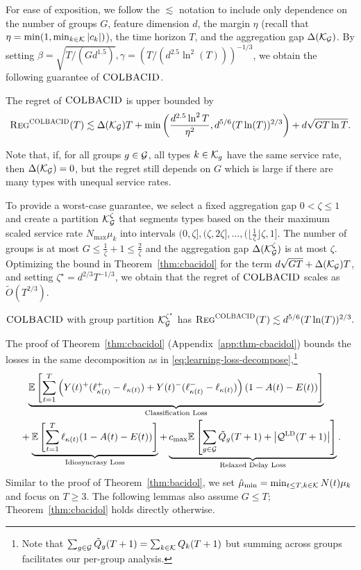 

For ease of exposition, we follow the $\lesssim$ notation to include only dependence on the number of groups $G$, feature dimension $d$, the margin $\eta$ (recall that $\eta = \min(1,\min_{k \in \mathcal{K}} |c_k|)$), the time horizon $T$, and the aggregation gap $\Delta(\mathcal{K}_{\mathcal{G}})$. By setting $\beta = \sqrt{T / (Gd^{1.5})}, \gamma = (T / (d^{2.5}\ln^{2}(T)))^{-1/3}$, we obtain the following guarantee of $\textsc{COLBACID}$. 
\begin{theorem}\label{thm:cbacidol}
The regret of $\textsc{COLBACID}$ is upper bounded by
\[
\textsc{Reg}^{\textsc{COLBACID}}(T) \lesssim \Delta(\mathcal{K}_{\mathcal{G}})T+\min\left(\frac{d^{2.5}\ln^{2} T}{\eta^2}, d^{5/6}(T\ln(T))^{2/3}\right)+ d\sqrt{GT \ln T}.
\]
\end{theorem}
\noindent Note that, if, for all groups $g \in \mathcal{G}$, all types $k \in \mathcal{K}_g$ have the same service rate, then $\Delta(\mathcal{K}_{\mathcal{G}}) = 0$, but the regret still depends on $G$ which is large if there are many types with unequal service rates.

To provide a worst-case guarantee, we select a fixed aggregation gap $0<\zeta\leq 1$ and create a partition $\mathcal{K}_{\mathcal{G}}^{\zeta}$ that segments types based on the their maximum scaled service rate $N_{\max}\mu_k$ into intervals $(0,\zeta],(\zeta,2\zeta],\ldots,(\lfloor \frac{1}{\zeta}\rfloor \zeta,1]$. The number of groups is at most $G \leq \frac{1}{\zeta} + 1 \leq \frac{2}{\zeta}$ and the aggregation gap $\Delta(\mathcal{K}_{\mathcal{G}}^{\zeta})$ is at most $\zeta$. Optimizing the bound in Theorem~\ref{thm:cbacidol} for the term $d\sqrt{GT} + \Delta(\mathcal{K}_{\mathcal{G}})T$, and setting $\zeta^\star = d^{2/3}T^{-1/3}$, we obtain that the regret of $\textsc{COLBACID}$ scales as $\tilde{O}(T^{2/3})$.
\begin{corollary}\label{corr:group-ind}
$\textsc{COLBACID}$ with group partition $\mathcal{K}_{\mathcal{G}}^{\zeta^\star}$ has
$
\textsc{Reg}^{\textsc{COLBACID}}(T) \lesssim d^{5/6}(T\ln(T))^{2/3}.
$
\end{corollary}
\noindent The proof of Theorem~\ref{thm:cbacidol} (Appendix~\ref{app:thm-cbacidol}) bounds the losses in the same decomposition as in \eqref{eq:learning-loss-decompose},\footnote{Note that $\sum_{g \in \mathcal{G}} \tilde{Q}_g(T+1) = \sum_{k \in \mathcal{K}} Q_k(T+1)$ but summing across groups facilitates our per-group analysis.}
\begin{align}
&\hspace{0.1in}\underbrace{\mathbb E\left[\sum_{t=1}^T \left(Y(t)^+(\ell_{\kappa(t)}^{+} - \ell_{\kappa(t)}) + Y(t)^-(\ell_{\kappa(t)}^{-}-\ell_{\kappa(t)})\right)(1 - A(t) - E(t))\right]}_{\text{Classification Loss}} \nonumber\\
&+  \underbrace{\mathbb E\left[\sum_{t=1}^T  \ell_{\kappa(t)}(1 - A(t) - E(t))\right]}_{\text{Idiosyncrasy Loss}} +\underbrace{c_{\max}\mathbb E\left[\sum_{g \in \mathcal{G}} \tilde{Q}_g(T+1) + \left|\mathcal{Q}^{\mathcal{\textsc{LD}}}(T+1)\right|\right]}_{\text{Relaxed Delay Loss}}.\label{eq:contextual-loss-decompose}
\end{align}
Similar to the proof of Theorem~\ref{thm:bacidol}, we set $\hat{\mu}_{\min} = \min_{t \leq T, k \in \mathcal{K}} N(t)\mu_k$ and focus on $T \geq 3$. The following lemmas also assume $G \leq T$; Theorem~\ref{thm:cbacidol} holds directly otherwise.


